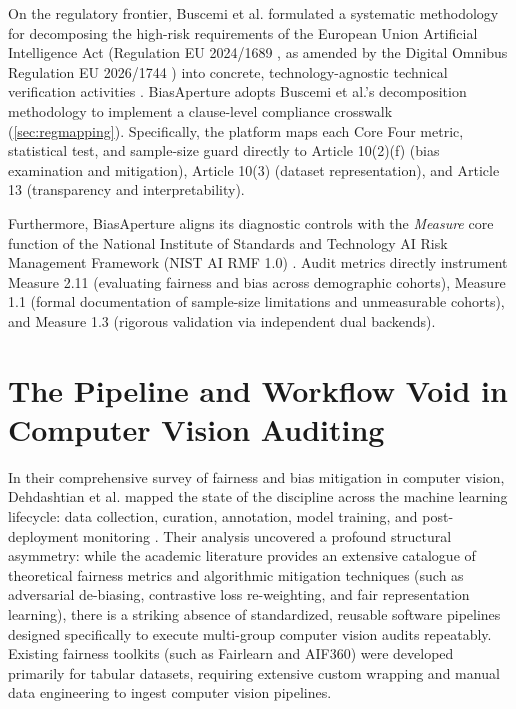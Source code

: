 On the regulatory frontier, Buscemi et al. formulated a systematic methodology for decomposing the high-risk requirements of the European Union Artificial Intelligence Act (Regulation EU 2024/1689 \cite{euaiact2024}, as amended by the Digital Omnibus Regulation EU 2026/1744 \cite{euomnibus2026}) into concrete, technology-agnostic technical verification activities \cite{buscemi2025assessing}. BiasAperture adopts Buscemi et al.'s decomposition methodology to implement a clause-level compliance crosswalk (\cref{sec:regmapping}). Specifically, the platform maps each Core Four metric, statistical test, and sample-size guard directly to Article 10(2)(f) (bias examination and mitigation), Article 10(3) (dataset representation), and Article 13 (transparency and interpretability).

Furthermore, BiasAperture aligns its diagnostic controls with the \emph{Measure} core function of the National Institute of Standards and Technology AI Risk Management Framework (NIST AI RMF 1.0) \cite{nist2023aiframework}. Audit metrics directly instrument Measure 2.11 (evaluating fairness and bias across demographic cohorts), Measure 1.1 (formal documentation of sample-size limitations and unmeasurable cohorts), and Measure 1.3 (rigorous validation via independent dual backends).


\section{The Pipeline and Workflow Void in Computer Vision Auditing}
\label{sec:lit_workflow_gap}

In their comprehensive survey of fairness and bias mitigation in computer vision, Dehdashtian et al. mapped the state of the discipline across the machine learning lifecycle: data collection, curation, annotation, model training, and post-deployment monitoring \cite{dehdashtian2024survey}. Their analysis uncovered a profound structural asymmetry: while the academic literature provides an extensive catalogue of theoretical fairness metrics and algorithmic mitigation techniques (such as adversarial de-biasing, contrastive loss re-weighting, and fair representation learning), there is a striking absence of standardized, reusable software pipelines designed specifically to execute multi-group computer vision audits repeatably. Existing fairness toolkits (such as Fairlearn and AIF360) were developed primarily for tabular datasets, requiring extensive custom wrapping and manual data engineering to ingest computer vision pipelines.

